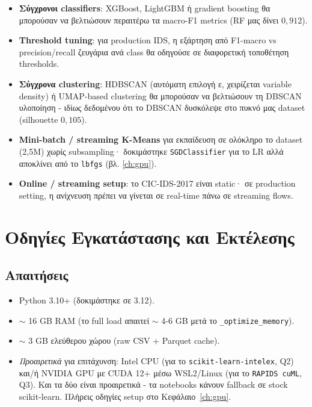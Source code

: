 \documentclass[12pt,a4paper,twoside]{book}
\begin{document}
\begin{itemize}
    \item \textbf{Σύγχρονοι classifiers}: XGBoost, LightGBM ή gradient
    boosting θα μπορούσαν να βελτιώσουν περαιτέρω τα macro-F1 metrics
    (RF μας δίνει \(0{,}912\)).
    \item \textbf{Threshold tuning}: για production IDS, η εξάρτηση από
    F1-macro vs precision/recall ζευγάρια ανά class θα οδηγούσε σε
    διαφορετική τοποθέτηση thresholds.
    \item \textbf{Σύγχρονα clustering}: HDBSCAN (αυτόματη επιλογή ε,
    χειρίζεται variable density) ή UMAP-based clustering θα μπορούσαν
    να βελτιώσουν τη DBSCAN υλοποίηση - ιδίως δεδομένου ότι το DBSCAN
    δυσκόλεψε στο πυκνό μας dataset (silhouette \(0{,}105\)).
    \item \textbf{Mini-batch / streaming K-Means} για εκπαίδευση σε
    ολόκληρο το dataset (2,5M) χωρίς subsampling· δοκιμάστηκε
    \texttt{SGDClassifier} για το LR αλλά αποκλίνει από το \texttt{lbfgs}
    (βλ. \ref{ch:gpu}).
    \item \textbf{Online / streaming setup}: το CIC-IDS-2017 είναι
    static· σε production setting, η ανίχνευση πρέπει να γίνεται σε
    real-time πάνω σε streaming flows.
\end{itemize}

\appendix

\chapter{Οδηγίες Εγκατάστασης και Εκτέλεσης}

\section{Απαιτήσεις}

\begin{itemize}
    \item Python 3.10+ (δοκιμάστηκε σε 3.12).
    \item \(\sim\) 16 GB RAM (το full load απαιτεί \(\sim\) 4-6 GB
    μετά το \texttt{\_optimize\_memory}).
    \item \(\sim\) 3 GB ελεύθερου χώρου (raw CSV + Parquet cache).
    \item \emph{Προαιρετικά} για επιτάχυνση: Intel CPU (για το
    \texttt{scikit-learn-intelex}, Q2) και/ή NVIDIA GPU με CUDA 12+ μέσω
    WSL2/Linux (για το \texttt{RAPIDS cuML}, Q3). Και τα δύο είναι
    προαιρετικά - τα notebooks κάνουν fallback σε stock scikit-learn.
    Πλήρεις οδηγίες setup στο Κεφάλαιο~\ref{ch:gpu}.
\end{itemize}
\end{document}
